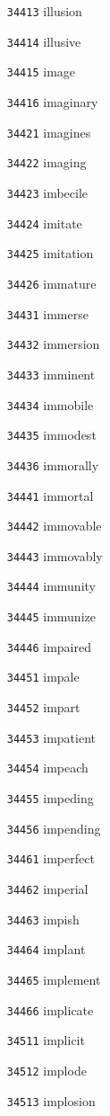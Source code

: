 \documentclass[twoside,11pt]{article}
\begin{document}
\begin{multicols}{5}
\begin{enumerate}
\item[\texttt{34413}] illusion
\item[\texttt{34414}] illusive
\item[\texttt{34415}] image
\item[\texttt{34416}] imaginary
\item[\texttt{34421}] imagines
\item[\texttt{34422}] imaging
\item[\texttt{34423}] imbecile
\item[\texttt{34424}] imitate
\item[\texttt{34425}] imitation
\item[\texttt{34426}] immature
\item[\texttt{34431}] immerse
\item[\texttt{34432}] immersion
\item[\texttt{34433}] imminent
\item[\texttt{34434}] immobile
\item[\texttt{34435}] immodest
\item[\texttt{34436}] immorally
\item[\texttt{34441}] immortal
\item[\texttt{34442}] immovable
\item[\texttt{34443}] immovably
\item[\texttt{34444}] immunity
\item[\texttt{34445}] immunize
\item[\texttt{34446}] impaired
\item[\texttt{34451}] impale
\item[\texttt{34452}] impart
\item[\texttt{34453}] impatient
\item[\texttt{34454}] impeach
\item[\texttt{34455}] impeding
\item[\texttt{34456}] impending
\item[\texttt{34461}] imperfect
\item[\texttt{34462}] imperial
\item[\texttt{34463}] impish
\item[\texttt{34464}] implant
\item[\texttt{34465}] implement
\item[\texttt{34466}] implicate
\item[\texttt{34511}] implicit
\item[\texttt{34512}] implode
\item[\texttt{34513}] implosion

\end{enumerate}
\end{multicols}
\end{document}
